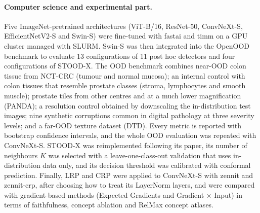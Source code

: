 \paragraph{Computer science and experimental part.} Five ImageNet-pretrained architectures (ViT-B/16, ResNet-50, ConvNeXt-S, EfficientNetV2-S and Swin-S) were fine-tuned with fastai and timm on a GPU cluster managed with SLURM. Swin-S was then integrated into the OpenOOD benchmark to evaluate 13 configurations of 11 post hoc detectors and four configurations of STOOD-X. The OOD benchmark combines near-OOD colon tissue from NCT-CRC (tumour and normal mucosa); an internal control with colon tissues that resemble prostate classes (stroma, lymphocytes and smooth muscle); prostate tiles from other centres and at a much lower magnification (PANDA); a resolution control obtained by downscaling the in-distribution test images; nine synthetic corruptions common in digital pathology at three severity levels; and a far-OOD texture dataset (DTD). Every metric is reported with bootstrap confidence intervals, and the whole OOD evaluation was repeated with ConvNeXt-S. STOOD-X was reimplemented following its paper, its number of neighbours $K$ was selected with a leave-one-class-out validation that uses in-distribution data only, and its decision threshold was calibrated with conformal prediction. Finally, LRP and CRP were applied to ConvNeXt-S with zennit and zennit-crp, after choosing how to treat its LayerNorm layers, and were compared with gradient-based methods (Expected Gradients and Gradient $\times$ Input) in terms of faithfulness, concept ablation and RelMax concept atlases.

